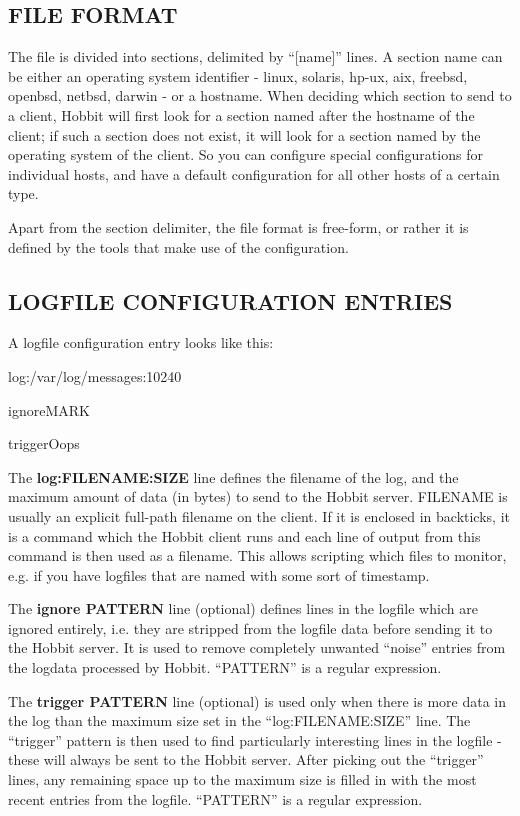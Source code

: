  
\subsection{FILE FORMAT}
 The file is divided into sections, delimited by ``[name]'' lines. A
 section name can be either an operating system identifier - linux,
 solaris, hp-ux, aix, freebsd, openbsd, netbsd, darwin - or a
 hostname. When deciding which section to send to a client, Hobbit
 will first look for a section named after the hostname of the client;
 if such a section does not exist, it will look for a section named by
 the operating system of the client. So you can configure special
 configurations for individual hosts, and have a default configuration
 for all other hosts of a certain type. 


  Apart from the section delimiter, the file format is free-form, or
  rather it is defined by the tools that make use of the
  configuration. 



 
\subsection{LOGFILE CONFIGURATION ENTRIES}
 A logfile configuration entry looks like this: 

  
log:/var/log/messages:10240  
 
ignoreMARK  
 
triggerOops 


  The \textbf{log:FILENAME:SIZE} line defines the filename of the log,
  and the maximum amount of data (in bytes) to send to the Hobbit
  server. FILENAME is usually an explicit full-path filename on the
  client. If it is enclosed in backticks, it is a command which the
  Hobbit client runs and each line of output from this command is then
  used as a filename. This allows scripting which files to monitor,
  e.g. if you have logfiles that are named with some sort of
  timestamp. 



  The \textbf{ignore PATTERN} line (optional) defines lines in the
  logfile which are ignored entirely, i.e. they are stripped from the
  logfile data before sending it to the Hobbit server. It is used to
  remove completely unwanted ``noise'' entries from the logdata
  processed by Hobbit. ``PATTERN'' is a regular expression. 



  The \textbf{trigger PATTERN}
 line (optional) is used only when there is more data in the log than
 the maximum size set in the ``log:FILENAME:SIZE'' line. The
 ``trigger'' pattern is then used to find particularly interesting
 lines in the logfile - these will always be sent to the Hobbit
 server. After picking out the ``trigger'' lines, any remaining space
 up to the maximum size is filled in with the most recent entries from
 the logfile. ``PATTERN'' is a regular expression. 



